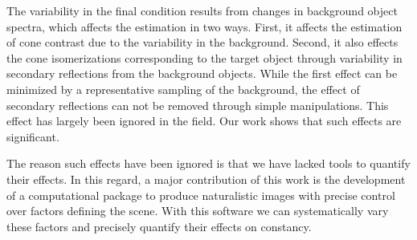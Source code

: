 \documentclass{jov}
\begin{document}
The variability in the final condition results from changes in background object spectra, which affects the estimation in two ways.
First, it affects the estimation of cone contrast due to the variability in the background.
Second, it also effects the cone isomerizations corresponding to the target object through 
variability in secondary reflections from the background objects.
While the first effect can be minimized by a representative sampling of the background, 
the effect of secondary reflections can not be removed through simple manipulations.
This effect has largely been ignored in the field. 
Our work shows that such effects are significant.

The reason such effects have been ignored is that we have lacked tools to quantify their effects.
In this regard, a major contribution of this work is the development of a computational package to
produce naturalistic images with precise control over factors defining the scene.
With this software we can systematically vary these factors and precisely quantify their effects on constancy.





\end{document}
